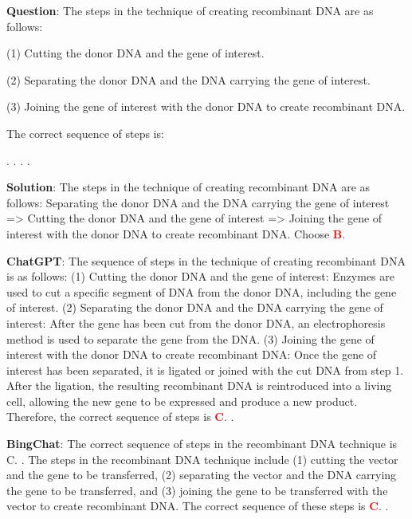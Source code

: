 \documentclass{article}
\begin{document}
{	
	
	\begin{mdframed}[linewidth=1pt,linecolor=red] \textbf{Question}: The steps in the technique of creating recombinant DNA are as follows:
		
		(1) Cutting the donor DNA and the gene of interest.
		
		(2) Separating the donor DNA and the DNA carrying the gene of interest.
		
		(3) Joining the gene of interest with the donor DNA to create recombinant DNA.
		
		The correct sequence of steps is: 
		
		\begin{oneparchoices}
			\choice .
			\choice .	
			\choice .
			\choice .
		\end{oneparchoices}
		
		\textbf{Solution}: The steps in the technique of creating recombinant DNA are as follows: Separating the donor DNA and the DNA carrying the gene of interest => Cutting the donor DNA and the gene of interest => Joining the gene of interest with the donor DNA to create recombinant DNA. Choose \textcolor{red}{\textbf{B}}. 
		
		\textbf{ChatGPT}: The sequence of steps in the technique of creating recombinant DNA is as follows:
		(1) Cutting the donor DNA and the gene of interest: Enzymes are used to cut a specific segment of DNA from the donor DNA, including the gene of interest.
		(2) Separating the donor DNA and the DNA carrying the gene of interest: After the gene has been cut from the donor DNA, an electrophoresis method is used to separate the gene from the DNA.
		(3) Joining the gene of interest with the donor DNA to create recombinant DNA: Once the gene of interest has been separated, it is ligated or joined with the cut DNA from step 1. After the ligation, the resulting recombinant DNA is reintroduced into a living cell, allowing the new gene to be expressed and produce a new product.
		Therefore, the correct sequence of steps is \textcolor{red}{\textbf{C}}. .
		
		\textbf{BingChat}: The correct sequence of steps in the recombinant DNA technique is C. .
		The steps in the recombinant DNA technique include (1) cutting the vector and the gene to be transferred, (2) separating the vector and the DNA carrying the gene to be transferred, and (3) joining the gene to be transferred with the vector to create recombinant DNA. The correct sequence of these steps is \textcolor{red}{\textbf{C}}. .
		

\end{mdframed}}
\end{document}
